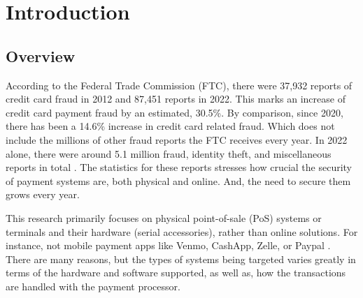 \chapter{\leavevmode Introduction}
\label{chap:introduction}

\section{Overview}

According to the Federal Trade Commission (FTC), there were 37,932 reports of credit card fraud in 2012 and 87,451 reports in 2022. This marks an increase of credit card payment fraud by an estimated, 30.5\%. By comparison, since 2020, there has been a 14.6\% increase in credit card related fraud. Which does not include the millions of other fraud reports the FTC receives every year. In 2022 alone, there were around 5.1 million fraud, identity theft, and miscellaneous reports in total \autocite{ConsumerSentinelNetwork2023,forthesentinelConsumerSentinelNetwork2022}. The statistics for these reports stresses how crucial the security of payment systems are, both physical and online. And, the need to secure them grows every year.

This research primarily focuses on physical point-of-sale (PoS) systems or terminals and their hardware (serial accessories), rather than online solutions. For instance, not mobile payment apps like Venmo, CashApp, Zelle, or Paypal \autocite{wangMobilePaymentSecurity2016}. There are many reasons, but the types of systems being targeted varies greatly in terms of the hardware and software supported, as well as, how the transactions are handled with the payment processor.

